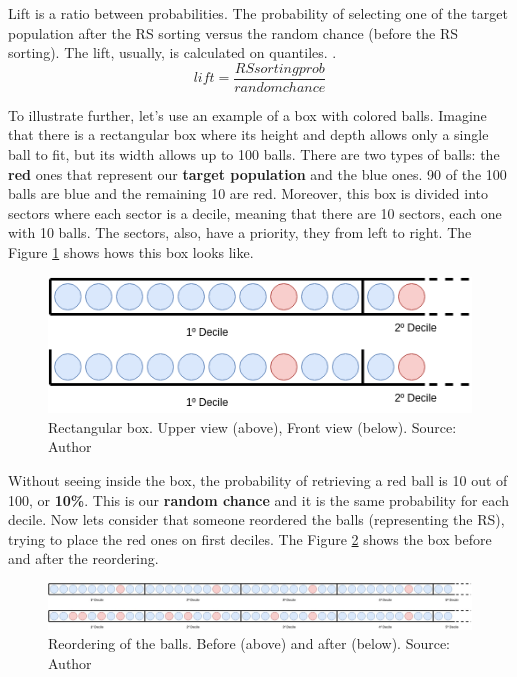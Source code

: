 Lift is a ratio between probabilities. The probability of selecting one of the target population after the RS sorting versus the random  chance (before the RS sorting). The lift, usually, is calculated on quantiles. \cite{LiftAnalysisADataScientistsSecretWeapon}.
\begin{equation}
	lift = \frac{RS sorting prob}{random chance}
\end{equation}

To illustrate further, let's use an example of a box with colored balls. Imagine that there is a rectangular box where its height and depth allows only a single ball to fit, but its width allows up to 100 balls. There are two types of balls: the \textbf{red} ones that represent our \textbf{target population} and the blue ones. 90 of the 100 balls are blue and the remaining 10 are red. Moreover, this box is divided into sectors where each sector is a decile, meaning that there are 10 sectors, each one with 10 balls. The sectors, also, have a priority, they from left to right. The Figure \ref{fig:rec-box} shows hows this box looks like.

\begin{figure}[h]
   \centering
   \includegraphics[width=\linewidth]{fig/ch2-rec-box.png}
   \caption{Rectangular box. Upper view (above), Front view (below).  Source: Author}
   \label{fig:rec-box}
\end{figure}

Without seeing inside the box, the probability of retrieving a red ball is 10 out of 100, or \textbf{10\%}. This is our \textbf{random chance} and it is the same probability for each decile. Now lets consider that someone reordered the balls (representing the RS), trying to place the red ones on first deciles. The Figure \ref{fig:rec-box-ordering} shows the box before and after the reordering.

\begin{figure}[h]
   \centering
   \includegraphics[width=\linewidth]{fig/ch2-rec-box-ordering.jpg}
   \caption{Reordering of the balls. Before (above) and after (below). Source: Author}
   \label{fig:rec-box-ordering}
\end{figure}

